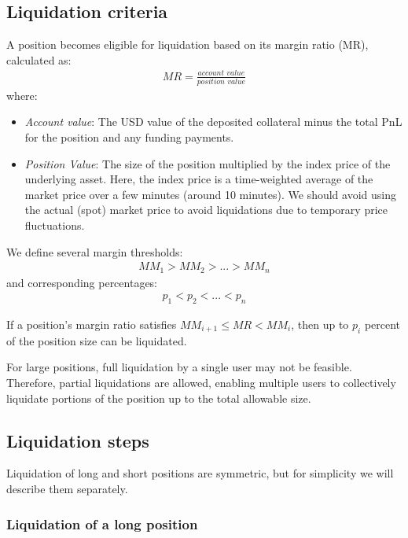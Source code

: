 \documentclass{article}
\begin{document}
\subsection{Liquidation criteria}

A position becomes eligible for liquidation based on its margin ratio (MR), calculated as:
\begin{align*}
\textit{MR}=\frac{\textit{account value}}{\textit{position value}}
\end{align*}
 where:
\begin{itemize}
\item \textit{Account value}: The USD value of the deposited collateral minus the total PnL for the position and any funding payments.
\item \textit{Position Value}: The size of the position multiplied by the index price of the underlying asset. Here, the index price is a time-weighted average of the market price over a few minutes (around 10 minutes). We should avoid using the actual (spot) market price to avoid liquidations due to temporary price fluctuations.
\end{itemize}

We define several margin thresholds:
\begin{align*}
MM_1>MM_2>...>MM_n
\end{align*}
and corresponding percentages:
\begin{align*}
p_1<p_2<...<p_n
\end{align*}

If a position’s margin ratio satisfies $MM_{i+1}\leq MR < MM_i$, then up to $p_i$ percent of the position size can be liquidated.

For large positions, full liquidation by a single user may not be feasible. Therefore, partial liquidations are allowed, enabling multiple users to collectively liquidate portions of the position up to the total allowable size.

\subsection{Liquidation steps}

Liquidation of long and short positions are symmetric, but for simplicity we will describe them separately.

\subsubsection{Liquidation of a long position}
\end{document}
